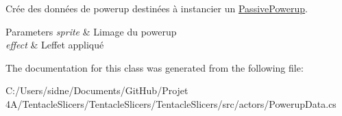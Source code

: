 Crée des données de powerup destinées à instancier un \hyperlink{class_tentacle_slicers_1_1actors_1_1_passive_powerup}{Passive\+Powerup}. 


\begin{DoxyParams}{Parameters}
{\em sprite} & L\textquotesingle{}image du powerup \\
\hline
{\em effect} & L\textquotesingle{}effet appliqué \\
\hline
\end{DoxyParams}


The documentation for this class was generated from the following file\+:\begin{DoxyCompactItemize}
\item 
C\+:/\+Users/sidne/\+Documents/\+Git\+Hub/\+Projet 4\+A/\+Tentacle\+Slicers/\+Tentacle\+Slicers/\+Tentacle\+Slicers/src/actors/Powerup\+Data.\+cs\end{DoxyCompactItemize}
